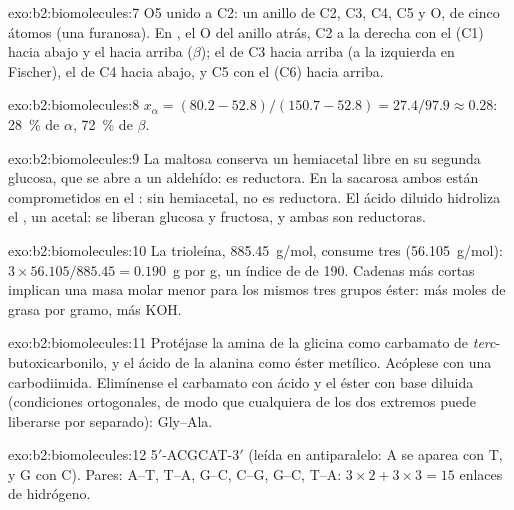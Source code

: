 \begin{solution}{exo:b2:biomolecules:7}
O5 unido a C2: un anillo de C2, C3, C4, C5 y O, de cinco átomos (una furanosa). En , el O del anillo
atrás, C2 a la derecha con el  (C1) hacia abajo y el  hacia arriba ($\beta$); el  de C3 hacia arriba (a la izquierda en
Fischer), el  de C4 hacia abajo, y C5 con el  (C6) hacia arriba.
\end{solution}

\begin{solution}{exo:b2:biomolecules:8}
$x_\alpha = (80.2 - 52.8)/(150.7 - 52.8) = 27.4/97.9 \approx 0.28$: 28~\% de $\alpha$, 72~\% de $\beta$.
\end{solution}

\begin{solution}{exo:b2:biomolecules:9}
La maltosa conserva un hemiacetal libre en su segunda glucosa, que se abre a un aldehído: es reductora. En la sacarosa
ambos  están comprometidos en el : sin hemiacetal, no es reductora. El ácido diluido
hidroliza el , un acetal: se liberan glucosa y fructosa, y ambas son reductoras.
\end{solution}

\begin{solution}{exo:b2:biomolecules:10}
La trioleína, \qty{885.45}{g/mol}, consume tres  (\qty{56.105}{g/mol}): $3 \times 56.105/885.45 =
0.190$~g por g, un índice de  de 190. Cadenas más cortas implican una masa molar menor para los mismos
tres grupos éster: más moles de grasa por gramo, más KOH.
\end{solution}

\begin{solution}{exo:b2:biomolecules:11}
Protéjase la amina de la glicina como carbamato de \textit{terc}-butoxicarbonilo, y el ácido de la alanina como
éster metílico. Acóplese con una carbodiimida. Elimínense el carbamato con ácido y el éster con base diluida
(condiciones ortogonales, de modo que cualquiera de los dos extremos puede liberarse por separado): Gly--Ala.
\end{solution}

\begin{solution}{exo:b2:biomolecules:12}
5$'$-ACGCAT-3$'$ (leída en antiparalelo: A se aparea con T, y G con C). Pares: A--T, T--A, G--C, C--G, G--C, T--A:
$3 \times 2 + 3 \times 3 = 15$ enlaces de hidrógeno.
\end{solution}

